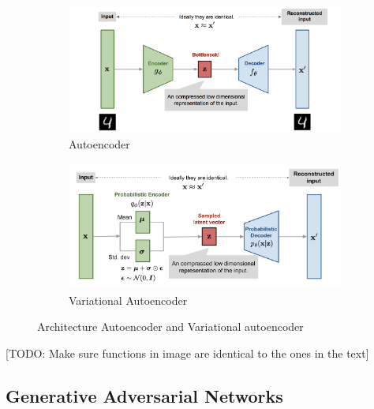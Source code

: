 \begin{figure}
    \begin{subfigure}{0.45\textwidth}
      \includegraphics[width=\linewidth]{images/ae.png}
      \caption{Autoencoder} \label{fig:ae}
    \end{subfigure}%
    \hspace*{\fill}   %
    \begin{subfigure}{0.45\textwidth}
      \includegraphics[width=\linewidth]{images/vae.png}
      \caption{Variational Autoencoder} \label{fig:vae}
    \end{subfigure}%
    \hspace*{\fill}   %
  \caption{Architecture Autoencoder and Variational autoencoder} \label{fig:vae_overview}
\end{figure}
[TODO: Make sure functions in image are identical to the ones in the text]



\subsection{Generative Adversarial Networks}
\label{ch:preliminaries-generativeAlgorithms-generativeAdversarialNetworks}

